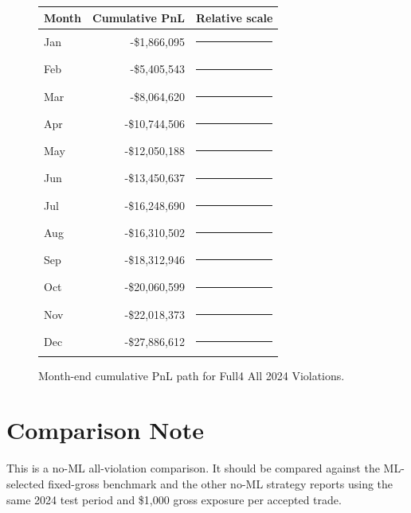 \documentclass[11pt]{article}
\begin{document}
\begin{figure}[h]
\centering
\begin{tabular}{@{}lrl@{}}
\toprule
Month & Cumulative PnL & Relative scale \\
\midrule
Jan & -\$1,866,095 & \textcolor{red}{\rule{0.7cm}{7pt}}\\
Feb & -\$5,405,543 & \textcolor{red}{\rule{1.9cm}{7pt}}\\
Mar & -\$8,064,620 & \textcolor{red}{\rule{2.9cm}{7pt}}\\
Apr & -\$10,744,506 & \textcolor{red}{\rule{3.9cm}{7pt}}\\
May & -\$12,050,188 & \textcolor{red}{\rule{4.3cm}{7pt}}\\
Jun & -\$13,450,637 & \textcolor{red}{\rule{4.8cm}{7pt}}\\
Jul & -\$16,248,690 & \textcolor{red}{\rule{5.8cm}{7pt}}\\
Aug & -\$16,310,502 & \textcolor{red}{\rule{5.8cm}{7pt}}\\
Sep & -\$18,312,946 & \textcolor{red}{\rule{6.6cm}{7pt}}\\
Oct & -\$20,060,599 & \textcolor{red}{\rule{7.2cm}{7pt}}\\
Nov & -\$22,018,373 & \textcolor{red}{\rule{7.9cm}{7pt}}\\
Dec & -\$27,886,612 & \textcolor{red}{\rule{10.0cm}{7pt}}\\
\bottomrule
\end{tabular}
\caption{Month-end cumulative PnL path for Full4 All 2024 Violations.}
\end{figure}

\section{Comparison Note}

This is a no-ML all-violation comparison. It should be compared against the ML-selected fixed-gross benchmark and the other no-ML strategy reports using the same 2024 test period and \$1,000 gross exposure per accepted trade.
\end{document}

